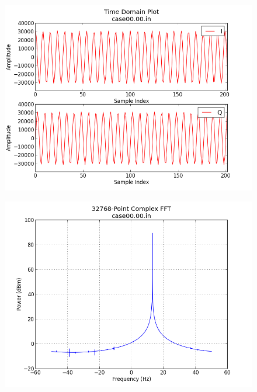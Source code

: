 \documentclass{article}
\begin{document}
\begin{flushleft}
        \begin{figure}[ht]
        \centering
                \begin{minipage}{.5\textwidth}
                        \centering\includegraphics[width=1.0\linewidth]{input_time}
                        \label{fig:in_time_tone}
                \end{minipage}%
                \begin{minipage}{.5\textwidth}
                        \centering\includegraphics[width=1.0\linewidth]{input_freq}
                        \label{fig:in_freq_tone}
                \end{minipage}
        \end{figure}



\end{flushleft}
\end{document}
